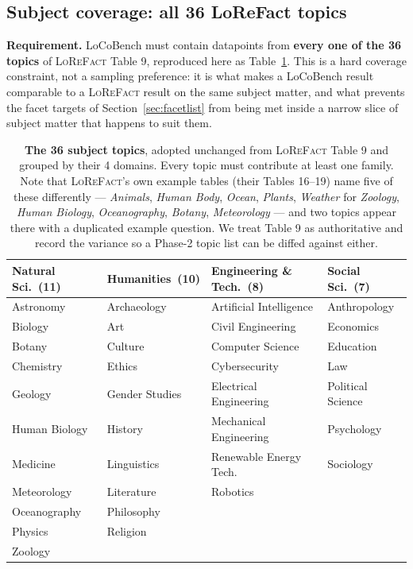 \documentclass[11pt]{article}
\begin{document}
\subsection{Subject coverage: all 36 LoReFact topics}
\label{sec:subjects}

\textbf{Requirement.} LoCoBench must contain datapoints from \textbf{every one of the 36 topics}
of \textsc{LoReFact} Table 9, reproduced here as Table~\ref{tab:topics}. This is a hard coverage
constraint, not a sampling preference: it is what makes a LoCoBench result comparable to a
\textsc{LoReFact} result on the same subject matter, and what prevents the facet targets of
Section~\ref{sec:facetlist} from being met inside a narrow slice of subject matter that happens
to suit them.

\begin{table}[!ht]\centering\small
\renewcommand{\arraystretch}{1.05}
\begin{tabular}{@{}>{\raggedright\arraybackslash}p{3.5cm}
                  >{\raggedright\arraybackslash}p{2.9cm}
                  >{\raggedright\arraybackslash}p{4.2cm}
                  >{\raggedright\arraybackslash}p{3.2cm}@{}}
\toprule
\textbf{Natural Sci.}~(11) & \textbf{Humanities}~(10) &
\textbf{Engineering \& Tech.}~(8) & \textbf{Social Sci.}~(7)\\
\midrule
Astronomy       & Archaeology  & Artificial Intelligence & Anthropology\\
Biology         & Art          & Civil Engineering       & Economics\\
Botany          & Culture      & Computer Science        & Education\\
Chemistry       & Ethics       & Cybersecurity           & Law\\
Geology         & Gender Studies & Electrical Engineering & Political Science\\
Human Biology   & History      & Mechanical Engineering  & Psychology\\
Medicine        & Linguistics  & Renewable Energy Tech.  & Sociology\\
Meteorology     & Literature   & Robotics                & \\
Oceanography    & Philosophy   &                         & \\
Physics         & Religion     &                         & \\
Zoology         &              &                         & \\
\bottomrule
\end{tabular}
\caption{\textbf{The 36 subject topics}, adopted unchanged from \textsc{LoReFact} Table 9 and
grouped by their 4 domains. Every topic must contribute at least one family. Note that
\textsc{LoReFact}'s own example tables (their Tables 16--19) name five of these differently ---
\emph{Animals}, \emph{Human Body}, \emph{Ocean}, \emph{Plants}, \emph{Weather} for
\emph{Zoology}, \emph{Human Biology}, \emph{Oceanography}, \emph{Botany}, \emph{Meteorology} ---
and two topics appear there with a duplicated example question. We treat Table 9 as
authoritative and record the variance so a Phase-2 topic list can be diffed against either.}
\label{tab:topics}
\end{table}
\end{document}
